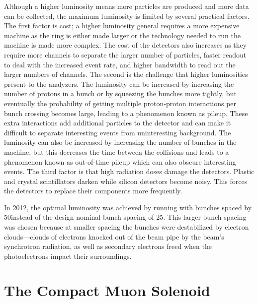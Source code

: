 Although a higher luminosity means more particles are produced and more data
can be collected, the maximum luminosity is limited by several practical
factors. The first factor is cost; a higher luminosity general requires a more
expensive machine as the ring is either made larger or the technology needed to
run the machine is made more complex. The cost of the detectors also increases
as they require more channels to separate the larger number of particles,
faster readout to deal with the increased event rate, and higher bandwidth to
read out the larger numbers of channels. The second is the challenge that
higher luminosities present to the analyzers. The luminosity can be increased
by increasing the number of protons in a bunch or by squeezing the bunches more
tightly, but eventually the probability of getting multiple proton-proton
interactions per bunch crossing becomes large, leading to a phenomenon known as
pileup. These extra interactions add additional particles to the detector and
can make it difficult to separate interesting events from uninteresting
background. The luminosity can also be increased by increasing the number of
bunches in the machine, but this decreases the time between the collisions and
leads to a phenomenon known as out-of-time pileup which can also obscure
interesting events. The third factor is that high radiation doses damage the
detectors. Plastic and crystal scintillators darken while silicon detectors
become noisy. This forces the detectors to replace their components more
frequently.

In 2012, the optimal luminosity was achieved by running with bunches spaced by
50\ns instead of the design nominal bunch spacing of 25\ns. This larger bunch
spacing was chosen because at smaller spacing the bunches were destabilized by
electron clouds---clouds of electrons knocked out of the beam pipe by the
beam's synchrotron radiation, as well as secondary electrons freed when the
photoelectrons impact their surroundings.

\section{The Compact Muon Solenoid}
\label{sec:cms}

